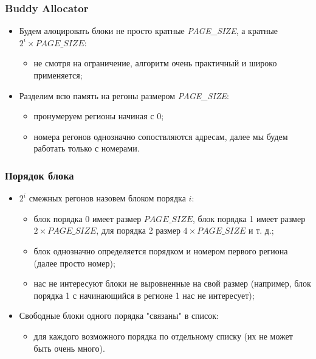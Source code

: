 \begin{frame}
\frametitle{Buddy Allocator}
\begin{itemize}
  \item Будем алоцировать блоки не просто кратные \emph{PAGE\_SIZE}, а кратные
  $2^i \times PAGE\_SIZE$:
  \begin{itemize}
    \item не смотря на ограничение, алгоритм очень практичный и широко
    применяется;
  \end{itemize}
  \item Разделим всю память на регоны размером \emph{PAGE\_SIZE}:
  \begin{itemize}
    \item пронумеруем регионы начиная с 0;
    \item номера регонов однозначно сопоствляются адресам, далее мы будем
    работать только с номерами.
  \end{itemize}
\end{itemize}
\end{frame}

\begin{frame}
\frametitle{Порядок блока}
\begin{itemize}
  \item $2^i$ смежных регонов назовем блоком порядка $i$:
  \begin{itemize}
    \item блок порядка 0 имеет размер $PAGE\_SIZE$, блок порядка 1 имеет размер
    $2 \times PAGE\_SIZE$, для порядка 2 размер $4 \times PAGE\_SIZE$ и т. д.;
    \item блок однозначно определяется порядком и номером первого региона (далее
    просто номер);
    \item нас не интересуют блоки не выровненные на свой размер (например, блок
    порядка 1 с начинающийся в регионе 1 нас не интересует);
  \end{itemize}
  \item Свободные блоки одного порядка "связаны" в список:
  \begin{itemize}
    \item для каждого возможного порядка по отдельному списку (их не может быть
    очень много).
  \end{itemize}
\end{itemize}
\end{frame}

